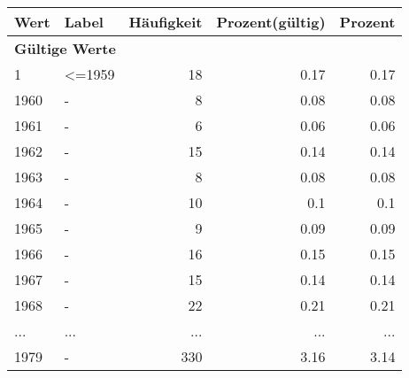      \begin{longtable}{lXrrr}
     \toprule
     \textbf{Wert} & \textbf{Label} & \textbf{Häufigkeit} & \textbf{Prozent(gültig)} & \textbf{Prozent} \\
     \endhead
     \midrule
     \multicolumn{5}{l}{\textbf{Gültige Werte}}\\
        1 & \multicolumn{1}{X}{\textless{}=1959} & %
          \num{18} &
          \num[round-mode=places,round-precision=2]{0.17} &
          \num[round-mode=places,round-precision=2]{0.17} \\
        1960 & \multicolumn{1}{X}{-} & %
          \num{8} &
          \num[round-mode=places,round-precision=2]{0.08} &
          \num[round-mode=places,round-precision=2]{0.08} \\
        1961 & \multicolumn{1}{X}{-} & %
          \num{6} &
          \num[round-mode=places,round-precision=2]{0.06} &
          \num[round-mode=places,round-precision=2]{0.06} \\
        1962 & \multicolumn{1}{X}{-} & %
          \num{15} &
          \num[round-mode=places,round-precision=2]{0.14} &
          \num[round-mode=places,round-precision=2]{0.14} \\
        1963 & \multicolumn{1}{X}{-} & %
          \num{8} &
          \num[round-mode=places,round-precision=2]{0.08} &
          \num[round-mode=places,round-precision=2]{0.08} \\
        1964 & \multicolumn{1}{X}{-} & %
          \num{10} &
          \num[round-mode=places,round-precision=2]{0.1} &
          \num[round-mode=places,round-precision=2]{0.1} \\
        1965 & \multicolumn{1}{X}{-} & %
          \num{9} &
          \num[round-mode=places,round-precision=2]{0.09} &
          \num[round-mode=places,round-precision=2]{0.09} \\
        1966 & \multicolumn{1}{X}{-} & %
          \num{16} &
          \num[round-mode=places,round-precision=2]{0.15} &
          \num[round-mode=places,round-precision=2]{0.15} \\
        1967 & \multicolumn{1}{X}{-} & %
          \num{15} &
          \num[round-mode=places,round-precision=2]{0.14} &
          \num[round-mode=places,round-precision=2]{0.14} \\
        1968 & \multicolumn{1}{X}{-} & %
          \num{22} &
          \num[round-mode=places,round-precision=2]{0.21} &
          \num[round-mode=places,round-precision=2]{0.21} \\
       ... & ... & ... & ... & ... \\
        1979 & \multicolumn{1}{X}{-} & %
          \num{330} &
          \num[round-mode=places,round-precision=2]{3.16} &
          \num[round-mode=places,round-precision=2]{3.14} \\


\end{longtable}
